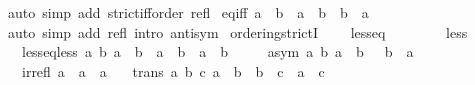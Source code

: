 \begin{isabellebody}
\ {\isacharparenleft}{\kern0pt}auto\ simp\ add{\isacharcolon}{\kern0pt}\ strict{\isacharunderscore}{\kern0pt}iff{\isacharunderscore}{\kern0pt}order\ refl{\isacharparenright}{\kern0pt}%
\endisatagproof
{\isafoldproof}%
%
\isadelimproof
\isanewline
%
\endisadelimproof
\isanewline
{}\isamarkupfalse%
\ eq{\isacharunderscore}{\kern0pt}iff{\isacharcolon}{\kern0pt}\ {\isacartoucheopen}a\ {\isacharequal}{\kern0pt}\ b\ {\isasymlongleftrightarrow}\ a\ \isactrlbold {\isasymle}\ b\ {\isasymand}\ b\ \isactrlbold {\isasymle}\ a{\isacartoucheclose}\isanewline
%
\isadelimproof
\ \ %
\endisadelimproof
%
\isatagproof
{}\isamarkupfalse%
\ {\isacharparenleft}{\kern0pt}auto\ simp\ add{\isacharcolon}{\kern0pt}\ refl\ intro{\isacharcolon}{\kern0pt}\ antisym{\isacharparenright}{\kern0pt}%
\endisatagproof
{\isafoldproof}%
%
\isadelimproof
\isanewline
%
\endisadelimproof
\isanewline
{}\isamarkupfalse%
\isanewline
\isanewline
{}\isamarkupfalse%
\ ordering{\isacharunderscore}{\kern0pt}strictI{\isacharcolon}{\kern0pt}\ %
\isanewline
\ \ \ less{\isacharunderscore}{\kern0pt}eq\ {\isacharparenleft}{\kern0pt}\ {\isacartoucheopen}\isactrlbold {\isasymle}{\isacartoucheclose}\ {}{}{\isacharparenright}{\kern0pt}\isanewline
\ \ \ \ \ less\ {\isacharparenleft}{\kern0pt}\ {\isacartoucheopen}\isactrlbold {\isacharless}{\kern0pt}{\isacartoucheclose}\ {}{}{\isacharparenright}{\kern0pt}\isanewline
\ \ \ less{\isacharunderscore}{\kern0pt}eq{\isacharunderscore}{\kern0pt}less{\isacharcolon}{\kern0pt}\ {\isacartoucheopen}{\isasymAnd}a\ b{\isachardot}{\kern0pt}\ a\ \isactrlbold {\isasymle}\ b\ {\isasymlongleftrightarrow}\ a\ \isactrlbold {\isacharless}{\kern0pt}\ b\ {\isasymor}\ a\ {\isacharequal}{\kern0pt}\ b{\isacartoucheclose}\isanewline
\ \ \ \ \ asym{\isacharcolon}{\kern0pt}\ {\isacartoucheopen}{\isasymAnd}a\ b{\isachardot}{\kern0pt}\ a\ \isactrlbold {\isacharless}{\kern0pt}\ b\ {\isasymLongrightarrow}\ {\isasymnot}\ b\ \isactrlbold {\isacharless}{\kern0pt}\ a{\isacartoucheclose}\isanewline
\ \ \ irrefl{\isacharcolon}{\kern0pt}\ {\isacartoucheopen}{\isasymAnd}a{\isachardot}{\kern0pt}\ {\isasymnot}\ a\ \isactrlbold {\isacharless}{\kern0pt}\ a{\isacartoucheclose}\isanewline
\ \ \ trans{\isacharcolon}{\kern0pt}\ {\isacartoucheopen}{\isasymAnd}a\ b\ c{\isachardot}{\kern0pt}\ a\ \isactrlbold {\isacharless}{\kern0pt}\ b\ {\isasymLongrightarrow}\ b\ \isactrlbold {\isacharless}{\kern0pt}\ c\ {\isasymLongrightarrow}\ a\ \isactrlbold {\isacharless}{\kern0pt}\ c{\isacartoucheclose}\isanewline

\end{isabellebody}
